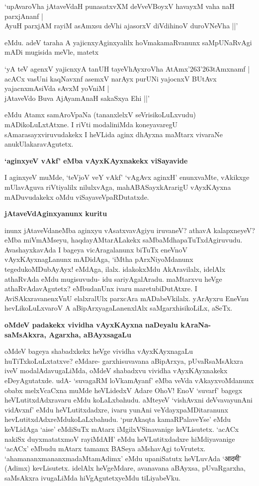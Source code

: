 \begin{shloka}
`upAvaroVha jAtaveVdaH punasatxvXM deVveVBoyxV havayxM vaha naH parxjAnanf |\\
AyuH parxjAM rayiM asAmxsu deVhi ajasorxV diVdihinoV duroVNeVha ||'
\end{shloka}

eMdu. adeV taraha A yajicnxyAginxyalilx hoVmakamaRvanunx saMpUNaRvAgi mADi mugisida meVle, matetx

\begin{shloka}
`yA teV agenxV yajicnxyA tanUH tayeVhAyxroVha AtAmx\char'263\char'263tAmxnamf |\\
acACx vasUni kaqNavxnf asemxV narAyx purUNi yajocnxV BUtAvx yajacnxmAsiVda sAvxM yoVniM |\\
jAtaveVdo Buva AjAyamAnaH sakaSxya Ehi ||'
\end{shloka}

eMdu Atamx samAroVpaNa (tananxlelxV seVrisikoLuLxvudu) mADikoLuLxtAtxne. I riVti modaliniMda koneyavaregU sAmarasayxviruvudakekx I heVLida aginx dhAyxna maMtarx vivaraNe anukUlakaravAgutetx.

{\bf `aginxyeV vAkf' eMba vAyxKAyxnakekx viSayavide}

I aginxyeV muMde, `teVjoV veY vAkf' `vAgAvx aginxH' enunxvaMte, vAkikxge mUlavAguva riVtiyalilx nilulxvAga, mahABASayxkArarigU vAyxKAyxna mADuvudakekx oMdu viSayaveVpaRDutatxde.

{\bf jAtaveVdAginxyanunx kuritu}

inunx jAtaveVdaneMba aginxyu vAsatxvavAgiyu iruvaneV? athavA kalapxneyeV? eMba miVmAMseyu, haqdayAMtarALakekx saMbaMdhapaTuTxdAgiruvudu. AvashayxkavAda I bageya vicAragalanunx biTuTx eneVnoV vAyxKAyxnagLanunx mADidAga, `iMtha pArxNiyoMdanunx tegedukoMDubAyAyx! eMdAga, ilalx. idakokxMdu AkAravilalx, idelAlx athaRvAda eMdu mugisuvudu- idu sariyAgalAradu. maMtarxvu heVge athaRvAdavAgutetx? eMbudanUnx ivaru maretubiDutAtxre. I AviSAkxravanenxVnU elalxralUlx parxcAra mADabeVkilalx. yArAyxru EneVnu hevLikoLuLxvaroV A aBipArxyagaLanenxlAlx saMgarxhisikoLiLx, aSeTx.

{\bf oMdeV padakekx vividha vAyxKAyxna naDeyalu kAraNa- saMsAkxra, Agarxha, aBAyxsagaLu}

oMdeV bageya shabadxkekx heVge vividha vAyxKAyxnagaLu huTiTxkoLuLxtatxve? eMdare- garxhisuvavana aBipArxya, pUvaRsaMsAkxra iveV modalAdavugaLiMda, oMdeV shabadxvu vividha vAyxKAyxnakekx eDeyAgutatxde. udA- `suvagaRM loVkamAyanf' eMba veVda vAkayxvoMdanunx obabx melxVcaCxna muMde heVLidedxV Adare OhoV! EnoV `suvarf' bagegx heVLutitxdAdxravaru eMdu koLaLxbahudu. aMteyeV `vishAvxni deVvavayunAni vidAvxnf' eMdu heVLutitxdadxre, ivaru yunAni veYdayxpaMDitaranunx hevLutitxdAdxreMdukoLaLxbahudu. `purAkaqta kamaRPalaveYse' eMdu keVLidAga `aise' eMdiSuTx mAtarx iMgilxVSinavanige keVLisutetx. `acACx nakiSx duyxmatatxmoV rayiMdAH' eMdu heVLutitxdadxre hiMdiyavanige `acACx' eMbudu mAtarx tamamx BASeya aMshavAgi toVrutetx. `ahamananxmananxmadaMtamAdimx' eMdu upaniSatutx heVLuvAda `आदमी' (Adimx) kevLisutetx. idelAlx heVgeMdare, avanavana aBAyxsa, pUvaRgarxha, saMsAkxra ivugaLiMda hiVgAgutetxyeMdu tiLiyabeVku.

